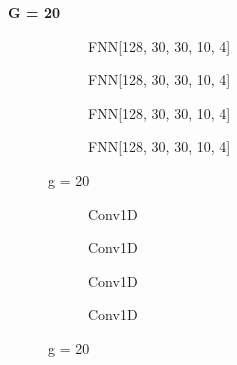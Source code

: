 \documentclass[a4paper,times,12pt]{article}
\begin{document}
\textbf{G = 20}

\begin{figure}[H]
    \centering
    \begin{subfigure}[t]{0.45\textwidth}
		\centering
        
        \caption{FNN[128, 30, 30, 10, 4]}
		\label{fig:a}
    \end{subfigure}\hfill
    \begin{subfigure}[t]{0.45\textwidth}
		\centering
        
        \caption{FNN[128, 30, 30, 10, 4]}
		\label{fig:b}
    \end{subfigure}\hfill    
    \begin{subfigure}[t]{0.45\textwidth}
        \centering
        
        \caption{FNN[128, 30, 30, 10, 4]}
		\label{fig:c}
    \end{subfigure}\hfill
    \begin{subfigure}[t]{0.45\textwidth}
        \centering
        
        \caption{FNN[128, 30, 30, 10, 4]}
		\label{fig:c}
    \end{subfigure}
	\caption{g = 20}
\end{figure}


\begin{figure}[H]
    \centering
    \begin{subfigure}[t]{0.45\textwidth}
		\centering
        
        \caption{Conv1D}
		\label{fig:a}
    \end{subfigure}\hfill
    \begin{subfigure}[t]{0.45\textwidth}
		\centering
        
        \caption{Conv1D}
		\label{fig:b}
    \end{subfigure}\hfill    
    \begin{subfigure}[t]{0.45\textwidth}
        \centering
        
        \caption{Conv1D}
		\label{fig:c}
    \end{subfigure}\hfill
    \begin{subfigure}[t]{0.45\textwidth}
        \centering
        
        \caption{Conv1D}
		\label{fig:d}
    \end{subfigure}
	\caption{g = 20}
\end{figure}
\end{document}
